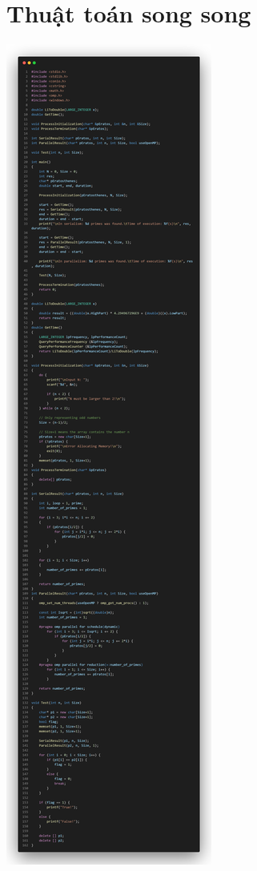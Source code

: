 \documentclass[12pt,a4paper]{report}
\begin{document}
\section{Thuật toán song song}
\begin{center}
	\includegraphics[trim=0in 57.75in 0in 0in, clip, scale=0.25]{./Photos/Primes/Parallel.PNG}

\end{center}
\end{document}
